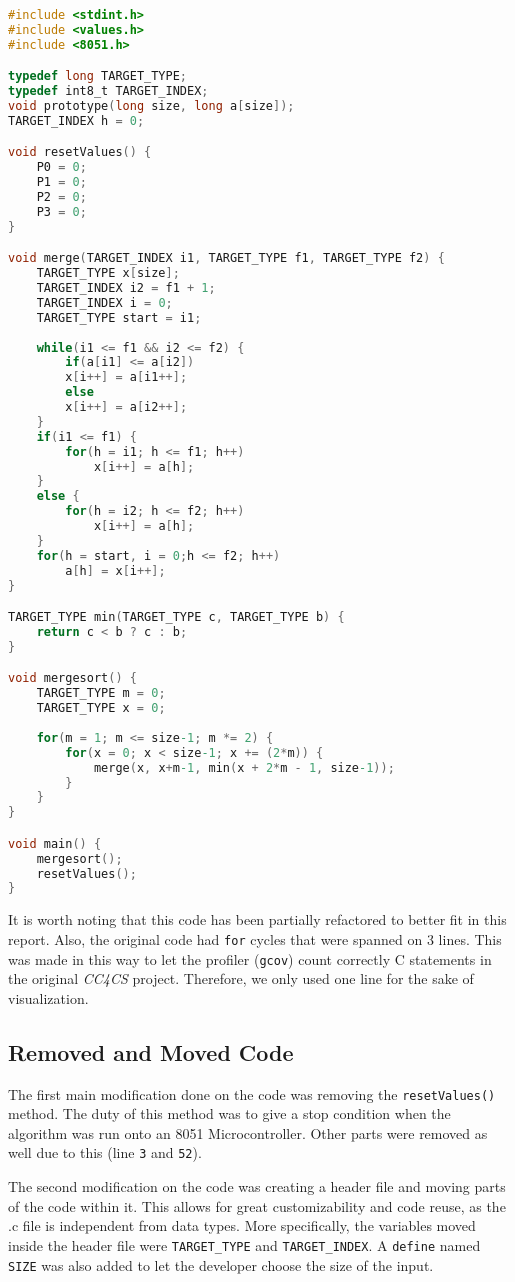 \begin{lstlisting}[label=lst:mergesort_original,caption=Original Mergesort Code,language=C,tabsize=4]
#include <stdint.h>
#include <values.h>
#include <8051.h>

typedef long TARGET_TYPE;
typedef int8_t TARGET_INDEX;
void prototype(long size, long a[size]);
TARGET_INDEX h = 0;

void resetValues() {
	P0 = 0;
	P1 = 0;
	P2 = 0;
	P3 = 0;
}

void merge(TARGET_INDEX i1, TARGET_TYPE f1, TARGET_TYPE f2) {
	TARGET_TYPE x[size];
	TARGET_INDEX i2 = f1 + 1;
	TARGET_INDEX i = 0;
	TARGET_TYPE start = i1;	
	
	while(i1 <= f1 && i2 <= f2) {
		if(a[i1] <= a[i2])
		x[i++] = a[i1++];
		else
		x[i++] = a[i2++];
	}
	if(i1 <= f1) {
		for(h = i1; h <= f1; h++) 
			x[i++] = a[h];
	}
	else {
		for(h = i2; h <= f2; h++)
			x[i++] = a[h];
	}
	for(h = start, i = 0;h <= f2; h++)
		a[h] = x[i++];
}

TARGET_TYPE min(TARGET_TYPE c, TARGET_TYPE b) {
	return c < b ? c : b;
}

void mergesort() {
	TARGET_TYPE m = 0;
	TARGET_TYPE x = 0;
	
	for(m = 1; m <= size-1; m *= 2) {
		for(x = 0; x < size-1; x += (2*m)) {
			merge(x, x+m-1, min(x + 2*m - 1, size-1));
		}
	}
}

void main() {
	mergesort();
	resetValues();
}
\end{lstlisting}


It is worth noting that this code has been partially refactored to better fit in this report. Also, the original code had \texttt{for} cycles that were spanned on 3 lines. This was made in this way to let the profiler (\texttt{gcov}) count correctly C statements in the original \textit{CC4CS} project. Therefore, we only used one line for the sake of visualization.

\subsection{Removed and Moved Code}

The first main modification done on the code was removing the \texttt{resetValues()} method. The duty of this method was to give a stop condition when the algorithm was run onto an 8051 Microcontroller. Other parts were removed as well due to this (line \texttt{3} and \texttt{52}).

The second modification on the code was creating a header file and moving parts of the code within it. This allows for great customizability and code reuse, as the .c file is independent from data types. More specifically, the variables moved inside the header file were \texttt{TARGET\_TYPE} and \texttt{TARGET\_INDEX}. A \texttt{define} named \texttt{SIZE} was also added to let the developer choose the size of the input.

